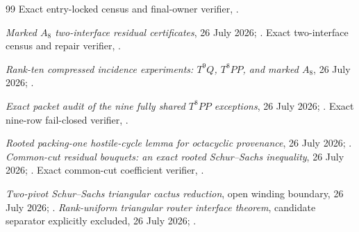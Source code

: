 \documentclass[11pt]{article}
\begin{document}
\begin{thebibliography}{99}
 Exact entry-locked census and final-owner verifier,
.

 \emph{Marked $A_8$ two-interface residual certificates},
26 July 2026;
.
 Exact two-interface census and repair verifier,
.

 \emph{Rank-ten compressed incidence experiments:
$T^9Q$, $T^8PP$, and marked $A_8$}, 26 July 2026;
.

 \emph{Exact packet audit of the nine fully shared $T^8PP$
exceptions}, 26 July 2026;
.
 Exact nine-row fail-closed verifier,
.

 \emph{Rooted packing-one hostile-cycle lemma for
octacyclic provenance}, 26 July 2026;
.
 \emph{Common-cut residual bouquets: an exact rooted
Schur--Sachs inequality}, 26 July 2026;
.
 Exact common-cut coefficient verifier,
.

 \emph{Two-pivot Schur--Sachs triangular cactus reduction},
open winding boundary, 26 July 2026;
.
 \emph{Rank-uniform triangular router interface
theorem}, candidate separator explicitly excluded, 26 July 2026;
.
\end{thebibliography}
\end{document}
